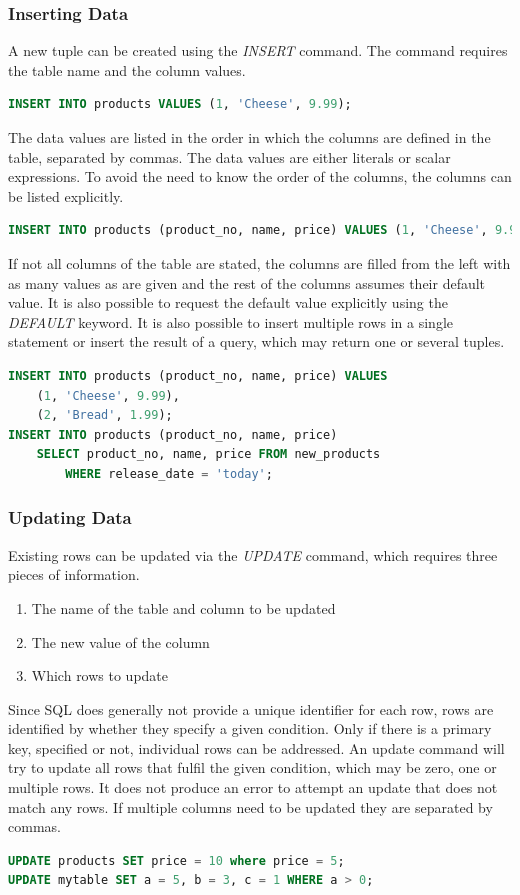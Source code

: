 \subsubsection{Inserting Data}
A new tuple can be created using the \textit{INSERT} command. The command requires the table name and the column values.
\begin{lstlisting}[language=SQL]
INSERT INTO products VALUES (1, 'Cheese', 9.99);
\end{lstlisting}
The data values are listed in the order in which the columns are defined in the table, separated by commas. The data values are either literals or scalar expressions. To avoid the need to know the order of the columns, the columns can be listed explicitly.
\begin{lstlisting}[language=SQL]
INSERT INTO products (product_no, name, price) VALUES (1, 'Cheese', 9.99);
\end{lstlisting}
If not all columns of the table are stated, the columns are filled from the left with as many values as are given and the rest of the columns assumes their default value. It is also possible to request the default value explicitly using the \textit{DEFAULT} keyword. It is also possible to insert multiple rows in a single statement or insert the result of a query, which may return one or several tuples.
\begin{lstlisting}[language=SQL]
INSERT INTO products (product_no, name, price) VALUES
	(1, 'Cheese', 9.99),
	(2, 'Bread', 1.99);
INSERT INTO products (product_no, name, price)
	SELECT product_no, name, price FROM new_products
		WHERE release_date = 'today';
\end{lstlisting}

\subsubsection{Updating Data}
Existing rows can be updated via the \textit{UPDATE} command, which requires three pieces of information.
\begin{enumerate}
\item The name of the table and column to be updated
\item The new value of the column
\item Which rows to update
\end{enumerate}
Since SQL does generally not provide a unique identifier for each row, rows are identified by whether they specify a given condition. Only if there is a primary key, specified or not, individual rows can be addressed. An update command will try to update all rows that fulfil the given condition, which may be zero, one or multiple rows. It does not produce an error to attempt an update that does not match any rows. If multiple columns need to be updated they are separated by commas.
\begin{lstlisting}[language=SQL]
UPDATE products SET price = 10 where price = 5;
UPDATE mytable SET a = 5, b = 3, c = 1 WHERE a > 0;
\end{lstlisting}

